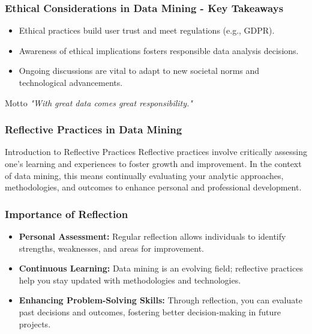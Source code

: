\documentclass[aspectratio=169]{beamer}
\begin{document}
\begin{frame}[fragile]
    \frametitle{Ethical Considerations in Data Mining - Key Takeaways}
    \begin{itemize}
        \item Ethical practices build user trust and meet regulations (e.g., GDPR).
        \item Awareness of ethical implications fosters responsible data analysis decisions.
        \item Ongoing discussions are vital to adapt to new societal norms and technological advancements.
    \end{itemize}
    \begin{block}{Motto}
        \centering \textit{"With great data comes great responsibility."}
    \end{block}
\end{frame}

\begin{frame}[fragile]
    \frametitle{Reflective Practices in Data Mining}
    \begin{block}{Introduction to Reflective Practices}
        Reflective practices involve critically assessing one's learning and experiences to foster growth and improvement. In the context of data mining, this means continually evaluating your analytic approaches, methodologies, and outcomes to enhance personal and professional development.
    \end{block}
\end{frame}

\begin{frame}[fragile]
    \frametitle{Importance of Reflection}
    \begin{itemize}
        \item \textbf{Personal Assessment:} Regular reflection allows individuals to identify strengths, weaknesses, and areas for improvement.
        \item \textbf{Continuous Learning:} Data mining is an evolving field; reflective practices help you stay updated with methodologies and technologies.
        \item \textbf{Enhancing Problem-Solving Skills:} Through reflection, you can evaluate past decisions and outcomes, fostering better decision-making in future projects.
    \end{itemize}
\end{frame}
\end{document}
